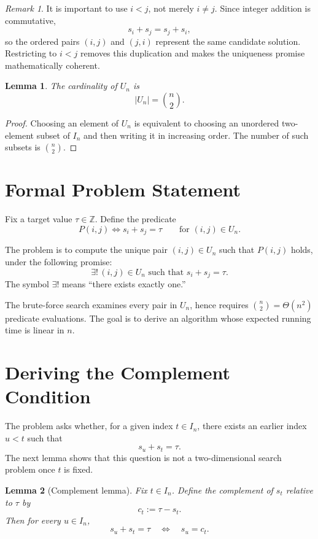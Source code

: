 \documentclass[11pt]{article}
\newtheorem{lemma}{Lemma}
\theoremstyle{remark}
\newtheorem{remark}{Remark}
\begin{document}
\begin{remark}
It is important to use \(i < j\), not merely \(i \neq j\). Since integer addition is commutative,
\[
s_i + s_j = s_j + s_i,
\]
so the ordered pairs \((i,j)\) and \((j,i)\) represent the same candidate solution. Restricting to \(i < j\) removes this duplication and makes the uniqueness promise mathematically coherent.
\end{remark}

\begin{lemma}
The cardinality of \(U_n\) is
\[
|U_n| = \binom{n}{2}.
\]
\end{lemma}

\begin{proof}
Choosing an element of \(U_n\) is equivalent to choosing an unordered two-element subset of \(I_n\) and then writing it in increasing order. The number of such subsets is \(\binom{n}{2}\).
\end{proof}

\section{Formal Problem Statement}

Fix a target value \(\tau \in \mathbb{Z}\). Define the predicate
\[
P(i,j) \iff s_i + s_j = \tau
\qquad \text{for } (i,j) \in U_n.
\]

The problem is to compute the unique pair \((i,j) \in U_n\) such that \(P(i,j)\) holds, under the following promise:
\[
\exists!\,(i,j) \in U_n \text{ such that } s_i + s_j = \tau.
\]
The symbol \(\exists!\) means ``there exists exactly one.''

The brute-force search examines every pair in \(U_n\), hence requires \(\binom{n}{2} = \Theta(n^2)\) predicate evaluations. The goal is to derive an algorithm whose expected running time is linear in \(n\).

\section{Deriving the Complement Condition}

The problem asks whether, for a given index \(t \in I_n\), there exists an earlier index \(u < t\) such that
\[
s_u + s_t = \tau.
\]
The next lemma shows that this question is not a two-dimensional search problem once \(t\) is fixed.

\begin{lemma}[Complement lemma]
Fix \(t \in I_n\). Define the \emph{complement} of \(s_t\) relative to \(\tau\) by
\[
c_t := \tau - s_t.
\]
Then for every \(u \in I_n\),
\[
s_u + s_t = \tau
\quad \Longleftrightarrow \quad
s_u = c_t.
\]
\end{lemma}
\end{document}
